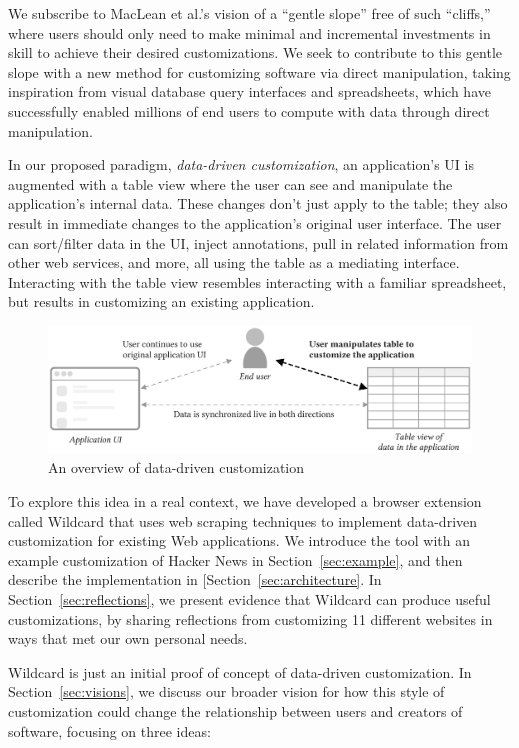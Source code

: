 \documentclass[sigplan,screen,10pt,anonymous,review]{acmart}
\begin{document}
We subscribe to MacLean et al.'s vision of a ``gentle slope''
\citep{maclean1990} free of such ``cliffs,'' where users should only
need to make minimal and incremental investments in skill to achieve
their desired customizations. We seek to contribute to this gentle slope
with a new method for customizing software via direct manipulation,
taking inspiration from visual database query interfaces and
spreadsheets, which have successfully enabled millions of end users to
compute with data through direct manipulation.

In our proposed paradigm, \emph{data-driven customization}, an
application's UI is augmented with a table view where the user can see
and manipulate the application's internal data. These changes don't just
apply to the table; they also result in immediate changes to the
application's original user interface. The user can sort/filter data in
the UI, inject annotations, pull in related information from other web
services, and more, all using the table as a mediating interface.
Interacting with the table view resembles interacting with a familiar
spreadsheet, but results in customizing an existing application.

\begin{figure}
\hypertarget{fig:overview}{%
\centering
\includegraphics[width=\textwidth]{media/overview.eps}
\caption{An overview of data-driven customization}\label{fig:overview}
}
\end{figure}

To explore this idea in a real context, we have developed a browser
extension called Wildcard that uses web scraping techniques to implement
data-driven customization for existing Web applications. We introduce
the tool with an example customization of Hacker News in
Section~\ref{sec:example}, and then describe the implementation in
{[}Section~\ref{sec:architecture}. In Section~\ref{sec:reflections}, we
present evidence that Wildcard can produce useful customizations, by
sharing reflections from customizing 11 different websites in ways that
met our own personal needs.

Wildcard is just an initial proof of concept of data-driven
customization. In Section~\ref{sec:visions}, we discuss our broader
vision for how this style of customization could change the relationship
between users and creators of software, focusing on three ideas:
\end{document}
